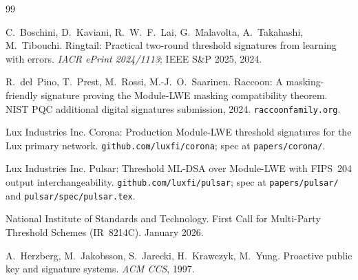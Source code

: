 \documentclass[11pt,a4paper]{article}
\theoremstyle{definition}
\theoremstyle{remark}
\begin{document}
\begin{thebibliography}{99}

C.~Boschini, D.~Kaviani, R.~W.~F.~Lai, G.~Malavolta, A.~Takahashi,
M.~Tibouchi.
\newblock Ringtail: Practical two-round threshold signatures from
learning with errors.
\newblock \emph{IACR ePrint 2024/1113}; IEEE S\&P 2025, 2024.

R.~del~Pino, T.~Prest, M.~Rossi, M.-J.~O.~Saarinen.
\newblock Raccoon: A masking-friendly signature proving the Module-LWE
masking compatibility theorem.
\newblock NIST PQC additional digital signatures submission, 2024.
\newblock \texttt{raccoonfamily.org}.

Lux Industries Inc.
\newblock Corona: Production Module-LWE threshold signatures for the Lux
primary network.
\newblock \texttt{github.com/luxfi/corona}; spec at
\texttt{papers/corona/}.

Lux Industries Inc.
\newblock Pulsar: Threshold ML-DSA over Module-LWE with FIPS~204
output interchangeability.
\newblock \texttt{github.com/luxfi/pulsar}; spec at
\texttt{papers/pulsar/} and \texttt{pulsar/spec/pulsar.tex}.

National Institute of Standards and Technology.
\newblock First Call for Multi-Party Threshold Schemes
(IR~8214C).
\newblock January 2026.

A.~Herzberg, M.~Jakobsson, S.~Jarecki, H.~Krawczyk, M.~Yung.
\newblock Proactive public key and signature systems.
\newblock \emph{ACM CCS}, 1997.

\end{thebibliography}
\end{document}
